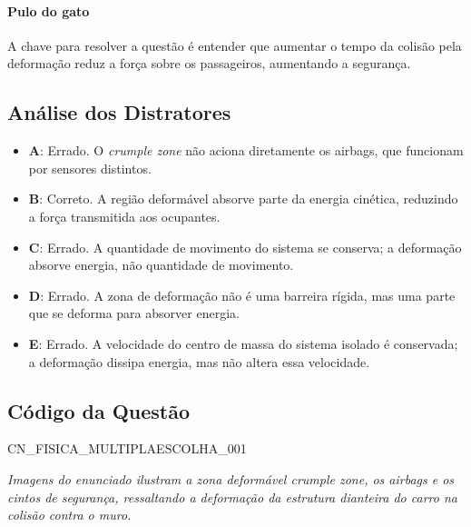 \documentclass{article}
\begin{document}
\paragraph{Pulo do gato}
A chave para resolver a questão é entender que aumentar o tempo da colisão pela deformação reduz a força sobre os passageiros, aumentando a segurança.

\bigskip

\subsection*{Análise dos Distratores}

\begin{itemize}
  \item \textbf{A}: Errado. O \emph{crumple zone} não aciona diretamente os airbags, que funcionam por sensores distintos.
  \item \textbf{B}: Correto. A região deformável absorve parte da energia cinética, reduzindo a força transmitida aos ocupantes.
  \item \textbf{C}: Errado. A quantidade de movimento do sistema se conserva; a deformação absorve energia, não quantidade de movimento.
  \item \textbf{D}: Errado. A zona de deformação não é uma barreira rígida, mas uma parte que se deforma para absorver energia.
  \item \textbf{E}: Errado. A velocidade do centro de massa do sistema isolado é conservada; a deformação dissipa energia, mas não altera essa velocidade.
\end{itemize}

\bigskip

\subsection*{Código da Questão}
CN\_FISICA\_MULTIPLAESCOLHA\_001

\bigskip

\textit{\small Imagens do enunciado ilustram a zona deformável \emph{crumple zone}, os airbags e os cintos de segurança, ressaltando a deformação da estrutura dianteira do carro na colisão contra o muro.}
\end{document}
